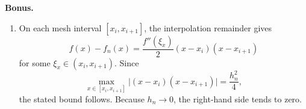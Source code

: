 \documentclass[a4paper]{article}
\begin{document}
\noindent\textbf{Bonus.}
\begin{enumerate}[itemsep=8pt]
    \item On each mesh interval $[x_i,x_{i+1}]$, the interpolation remainder gives
    \[
        f(x)-f_n(x)=\frac{f''(\xi_x)}{2}(x-x_i)(x-x_{i+1})
    \]
    for some $\xi_x\in(x_i,x_{i+1})$. Since
    \[
        \max_{x\in[x_i,x_{i+1}]}\lvert(x-x_i)(x-x_{i+1})\rvert
        =\frac{h_n^2}{4},
    \]
    the stated bound follows. Because $h_n\to0$, the right-hand side tends to zero.
\end{enumerate}
\fi
\end{document}
